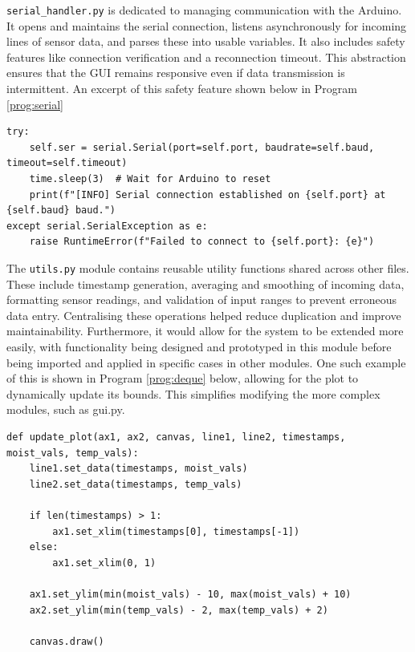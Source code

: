 \documentclass[a4paper,11pt]{article}
\begin{document}
\texttt{serial\_handler.py} is dedicated to managing communication with the Arduino. 
It opens and maintains the serial connection, 
listens asynchronously for incoming lines of sensor data, 
and parses these into usable variables. 
It also includes safety features like 
connection verification and a reconnection timeout. 
This abstraction ensures that the GUI remains responsive 
even if data transmission is intermittent.
An excerpt of this safety feature shown below in Program \ref{prog:serial}

\begin{lstlisting}[style=python-style, 
caption={LED warning light}, label={prog:serial}]
try:
    self.ser = serial.Serial(port=self.port, baudrate=self.baud, timeout=self.timeout)
    time.sleep(3)  # Wait for Arduino to reset
    print(f"[INFO] Serial connection established on {self.port} at {self.baud} baud.")
except serial.SerialException as e:
    raise RuntimeError(f"Failed to connect to {self.port}: {e}")
\end{lstlisting}

The \texttt{utils.py} module contains reusable utility functions 
shared across other files. 
These include timestamp generation, averaging and smoothing of incoming data, 
formatting sensor readings, and validation of input ranges to prevent erroneous data entry. 
Centralising these operations helped reduce duplication and improve maintainability.
Furthermore, it would allow for the system to be extended more easily,
with functionality being designed and prototyped in this module 
before being imported and applied in specific cases in other modules.
One such example of this is shown in Program \ref{prog:deque} below,
allowing for the plot to dynamically update its bounds.
This simplifies modifying the more complex modules,
such as gui.py.

\begin{lstlisting}[style=python-style, 
caption={Update Plot function}, label={prog:deque}]
def update_plot(ax1, ax2, canvas, line1, line2, timestamps, moist_vals, temp_vals):
    line1.set_data(timestamps, moist_vals)
    line2.set_data(timestamps, temp_vals)

    if len(timestamps) > 1:
        ax1.set_xlim(timestamps[0], timestamps[-1])
    else:
        ax1.set_xlim(0, 1)

    ax1.set_ylim(min(moist_vals) - 10, max(moist_vals) + 10)
    ax2.set_ylim(min(temp_vals) - 2, max(temp_vals) + 2)

    canvas.draw()
\end{lstlisting}
\end{document}
